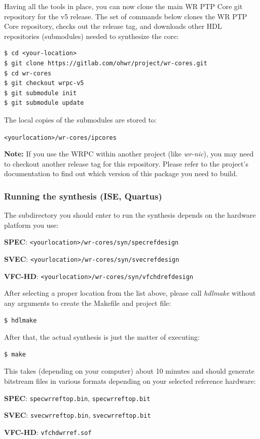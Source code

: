 \documentclass[a4paper, 12pt]{article}
\renewcommand{\_}{\underscore\allowbreak}
\begin{document}
Having all the tools in place, you can now clone the main WR PTP Core git
repository for the v5 release. The set of commands below clones the WR PTP Core
repository, checks out the release tag, and downloads other HDL repositories
(submodules) needed to synthesize the core:
\begin{lstlisting}
$ cd <your-location>
$ git clone https://gitlab.com/ohwr/project/wr-cores.git
$ cd wr-cores
$ git checkout wrpc-v5
$ git submodule init
$ git submodule update
\end{lstlisting}

The local copies of the submodules are stored to:

\texttt{<your\_location>/wr-cores/ip\_cores}

\vspace{1em}
\textbf{Note:} If you use the WRPC within another project (like
\textit{wr-nic}), you may need to checkout another release tag for this
repository. Please refer to the project's documentation to find out which
version of this package you need to build.

\subsubsection{Running the synthesis (ISE, Quartus)}
The subdirectory you should enter to run the synthesis depends on the hardware
platform you use:
\begin{itemize*}
  \item \textbf{SPEC}: \texttt{<your\_location>/wr-cores/syn/spec\_ref\_design}
  \item \textbf{SVEC}: \texttt{<your\_location>/wr-cores/syn/svec\_ref\_design}
  \item \textbf{VFC-HD}: \texttt{<your\_location>/wr-cores/syn/vfchd\_ref\_design}
\end{itemize*}

After selecting a proper location from the list above, please call
\textit{hdlmake} without any arguments to create the Makefile and project file:
\begin{lstlisting}
$ hdlmake
\end{lstlisting}

After that, the actual synthesis is just the matter of executing:
\begin{lstlisting}
$ make
\end{lstlisting}

This takes (depending on your computer) about 10 minutes and should generate
bitstream files in various formats depending on your selected reference
hardware:
\begin{itemize*}
  \item \textbf{SPEC}: \texttt{spec\_wr\_ref\_top.bin}, \texttt{spec\_wr\_ref\_top.bit}
  \item \textbf{SVEC}: \texttt{svec\_wr\_ref\_top.bin}, \texttt{svec\_wr\_ref\_top.bit}
  \item \textbf{VFC-HD}: \texttt{vfchd\_wr\_ref.sof}
\end{itemize*}
\end{document}
